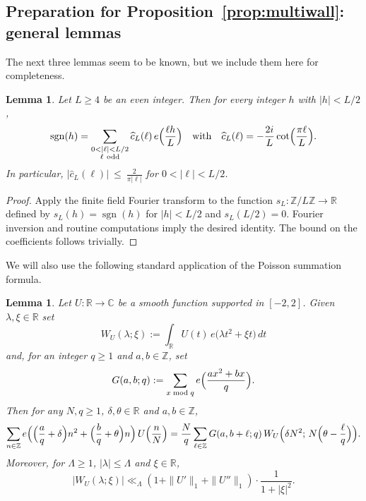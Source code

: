 \documentclass[a4paper,reqno,12pt]{amsart}
\theoremstyle{plain}
\newtheorem{lemma}[theorem]{Lemma}
\theoremstyle{plain}
\theoremstyle{remark}
\theoremstyle{plain}
\newcommand{\RR}{\mathbb{R}}
\theoremstyle{plain}
\theoremstyle{plain}
\begin{document}
{\subsection{Preparation for Proposition~\ref{prop:multiwall}: general
lemmas}\label{sec:lemmas}

The next three lemmas seem to be known, but we include them here for completeness.

\begin{lemma}\label{lem:sgn}
Let $L\ge4$ be an even integer. Then for every integer $h$ with $|h|<L/2$,
\begin{equation}\label{eq:saw}
\operatorname{sgn}(h)
=\sum_{\substack{0<|\ell|<L/2\\ \ell\ \mathrm{odd}}}
\widehat c_L(\ell)\,e\Bigl(\frac{\ell h}L\Bigr)
\quad \text{with} \quad
\widehat c_L(\ell)=-\frac{2i}L\cot\Bigl(\frac{\pi\ell}L\Bigr).
\end{equation}
In particular, $|\widehat c_L(\ell)|\ \le\ \frac2{\pi|\ell|}$ for $0<|\ell|<L/2$.
\end{lemma}

\begin{proof}
Apply the finite field Fourier transform to the function $s_L: \mathbb Z/L\mathbb Z \to \mathbb{R}$ defined by $s_L(h)=\operatorname{sgn}(h)$ for $|h|<L/2$ and $s_L(L/2)=0$. Fourier inversion and routine computations imply the desired identity. The bound on the coefficients follows trivially.
\end{proof}

We will also use the following standard application of the Poisson summation formula. 

\begin{lemma}\label{lem:poisson}
Let $U:\mathbb R\to\mathbb C$ be a smooth function supported in $[-2,2]$. 
Given $\lambda,\xi\in\RR$ set
\[
W_U(\lambda;\xi):=\int_{\mathbb R}U(t)\,e\bigl(\lambda t^2+\xi t\bigr)\,{dt}
\]
and, for an integer $q \geq 1$ and $a,b \in \mathbb{Z}$, set
\[
G(a,b;q):=\sum_{x\bmod q}e\Bigl(\frac{ax^2+bx}q\Bigr).
\]
Then for any $N, q \geq 1$, $\delta, \theta \in \RR$ and $a, b \in \mathbb{Z}$,  
\begin{equation}\label{eq:poisson}
\sum_{n\in\mathbb Z}e\Bigl(\Bigl(\frac aq+\delta\Bigr)n^2
+\Bigl(\frac bq+\theta\Bigr)n\Bigr)\,U\Bigl(\frac nN\Bigr)
=\frac Nq\sum_{\ell\in\mathbb Z}G(a,b+\ell;q)\,
W_U\Bigl(\delta N^2;\,N\Bigl(\theta-\frac{\ell}q\Bigr)\Bigr).
\end{equation}
Moreover, for $\Lambda\ge1$, $|\lambda|\le\Lambda$ and $\xi\in\RR$,
\[
|W_U(\lambda;\xi)|\ll_{\Lambda} (1 + \|U'\|_{1} + \|U''\|_{1}) \cdot \frac{1}{1+|\xi|^2}.
\]
\end{lemma}

}
\end{document}

